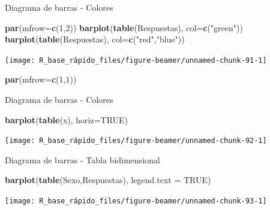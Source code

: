 \documentclass[
  ignorenonframetext,
  aspectratio=169]{beamer}
\newenvironment{Shaded}{\begin{snugshade}}{\end{snugshade}}
\newcommand{\AttributeTok}[1]{\textcolor[rgb]{0.13,0.29,0.53}{#1}}
\newcommand{\ConstantTok}[1]{\textcolor[rgb]{0.56,0.35,0.01}{#1}}
\newcommand{\DecValTok}[1]{\textcolor[rgb]{0.00,0.00,0.81}{#1}}
\newcommand{\FunctionTok}[1]{\textcolor[rgb]{0.13,0.29,0.53}{\textbf{#1}}}
\newcommand{\NormalTok}[1]{#1}
\newcommand{\StringTok}[1]{\textcolor[rgb]{0.31,0.60,0.02}{#1}}
\begin{document}
\begin{frame}[fragile]{Diagrama de barras - Colores}
\label{diagrama-de-barras---colores}
\begin{Shaded}
\begin{Highlighting}[]
\FunctionTok{par}\NormalTok{(}\AttributeTok{mfrow=}\FunctionTok{c}\NormalTok{(}\DecValTok{1}\NormalTok{,}\DecValTok{2}\NormalTok{))}
\FunctionTok{barplot}\NormalTok{(}\FunctionTok{table}\NormalTok{(Respuestas), }\AttributeTok{col=}\FunctionTok{c}\NormalTok{(}\StringTok{"green"}\NormalTok{))}
\FunctionTok{barplot}\NormalTok{(}\FunctionTok{table}\NormalTok{(Respuestas), }\AttributeTok{col=}\FunctionTok{c}\NormalTok{(}\StringTok{"red"}\NormalTok{,}\StringTok{"blue"}\NormalTok{))}
\end{Highlighting}
\end{Shaded}

\begin{center}\texttt{[image: R\_base\_rápido\_files/figure-beamer/unnamed-chunk-91-1]} \end{center}

\begin{Shaded}
\begin{Highlighting}[]
\FunctionTok{par}\NormalTok{(}\AttributeTok{mfrow=}\FunctionTok{c}\NormalTok{(}\DecValTok{1}\NormalTok{,}\DecValTok{1}\NormalTok{))}
\end{Highlighting}
\end{Shaded}
\end{frame}

\begin{frame}[fragile]{Diagrama de barras - Colores}
\label{diagrama-de-barras---colores-1}
\begin{Shaded}
\begin{Highlighting}[]
\FunctionTok{barplot}\NormalTok{(}\FunctionTok{table}\NormalTok{(x), }\AttributeTok{horiz=}\ConstantTok{TRUE}\NormalTok{)}
\end{Highlighting}
\end{Shaded}

\begin{center}\texttt{[image: R\_base\_rápido\_files/figure-beamer/unnamed-chunk-92-1]} \end{center}
\end{frame}

\begin{frame}[fragile]{Diagrama de barras - Tabla bidimensional}
\label{diagrama-de-barras---tabla-bidimensional}
\begin{Shaded}
\begin{Highlighting}[]
\FunctionTok{barplot}\NormalTok{(}\FunctionTok{table}\NormalTok{(Sexo,Respuestas), }\AttributeTok{legend.text =} \ConstantTok{TRUE}\NormalTok{)}
\end{Highlighting}
\end{Shaded}

\begin{center}\texttt{[image: R\_base\_rápido\_files/figure-beamer/unnamed-chunk-93-1]} \end{center}
\end{frame}
\end{document}
